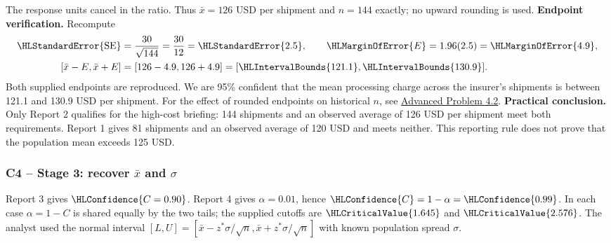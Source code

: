 The response units cancel in the ratio. Thus $\bar x=126$ USD per shipment and $n=144$ exactly; no upward rounding is used.
\textbf{Endpoint verification.} Recompute
\[\begin{aligned}
\HLStandardError{\mathrm{SE}}&=\frac{30}{\sqrt{144}}=\frac{30}{12}=\HLStandardError{2.5},\qquad \HLMarginOfError{E}=1.96(2.5)=\HLMarginOfError{4.9},\\
[\bar x-E,\bar x+E]&=[126-4.9,126+4.9]=[\HLIntervalBounds{121.1},\HLIntervalBounds{130.9}].
\end{aligned}\]
Both supplied endpoints are reproduced. We are 95\% confident that the mean processing charge across the insurer's shipments is between 121.1 and 130.9 USD per shipment.
For the effect of rounded endpoints on historical $n$, see \hyperref[prob:c4-advanced-2]{Advanced Problem 4.2}.
\textbf{Practical conclusion.} Only Report 2 qualifies for the high-cost briefing: 144 shipments and an observed average of 126 USD per shipment meet both requirements. Report 1 gives 81 shipments and an observed average of 120 USD and meets neither. This reporting rule does not prove that the population mean exceeds 125 USD.
\clearpage
\subsubsection*{C4 -- Stage 3: recover $\bar x$ and $\sigma$}\label{sol:c4-3-c}
\begingroup
\setlength{\abovedisplayskip}{6pt}
\setlength{\belowdisplayskip}{6pt}
\setlength{\abovedisplayshortskip}{3pt}
\setlength{\belowdisplayshortskip}{4pt}
\setlength{\parskip}{4pt}

Report 3 gives $\HLConfidence{C=0.90}$. Report 4 gives $\alpha=0.01$, hence $\HLConfidence{C}=1-\alpha=\HLConfidence{0.99}$. In each case $\alpha=1-C$ is shared equally by the two tails; the supplied cutoffs are $\HLCriticalValue{1.645}$ and $\HLCriticalValue{2.576}$. The analyst used the normal interval $[L,U]=[\bar x-z^*\sigma/\sqrt n,\bar x+z^*\sigma/\sqrt n]$ with known population spread $\sigma$.

